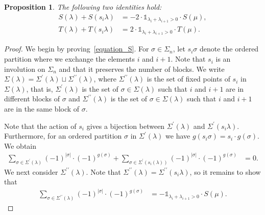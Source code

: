 \documentclass[10pt]{amsart}
\newtheorem{prop}[theorem]{Proposition}
\theoremstyle{definition}
\newcommand{\ungras}{\mathds{1}}
\begin{document}
\begin{prop}
The following two identities hold:
\begin{align}
S(\lambda) + S(s_{i}\lambda)
& =
-2 \cdot \ungras_{\lambda_{i}+\lambda_{i+1}>0}\cdot S(\mu) ,
\label{equation_S} \\
T(\lambda) + T(s_{i}\lambda)
& =
2 \cdot \ungras_{\lambda_{i}+\lambda_{i+1}>0}\cdot T(\mu) .
\label{equation_T}
\end{align}
\label{proposition_S_equal_T}
\end{prop}
\begin{proof}
We begin by proving~\eqref{equation_S}.
For $\sigma \in \Sigma_{n}$, let $s_{i}\sigma$ denote the
ordered partition where we exchange the elements $i$ and $i+1$.
Note that $s_{i}$ is an involution on $\Sigma_{n}$
and that it preserves the number of blocks.
We write
$\Sigma(\lambda) =\Sigma^{\prime}(\lambda) \sqcup \Sigma^{\prime\prime}(\lambda)$,
where $\Sigma^{\prime\prime}(\lambda)$ is the set of fixed points of $s_{i}$
in~$\Sigma(\lambda)$,
that is, 
$\Sigma^{\prime}(\lambda)$ is the set of $\sigma\in\Sigma(\lambda)$
such that $i$ and $i+1$ are in different blocks of $\sigma$
and
$\Sigma^{\prime\prime}(\lambda)$ is the set of $\sigma\in\Sigma(\lambda)$
such that $i$ and $i+1$ are in the same block of $\sigma$.



Note that the action of $s_{i}$ gives a bijection between
$\Sigma^{\prime}(\lambda)$ and $\Sigma^{\prime}(s_{i} \lambda)$.
Furthermore, for an ordered partition $\sigma$ in $\Sigma^{\prime}(\lambda)$
we have
$g(s_{i}\sigma) = s_{i}\cdot g(\sigma)$.
We obtain
\begin{align}
\sum_{\sigma \in \Sigma^{\prime}(\lambda)}
(-1)^{|\sigma|} \cdot (-1)^{g(\sigma)}
+
\sum_{\sigma \in \Sigma^{\prime}(s_{i}(\lambda))}
(-1)^{|\sigma|} \cdot (-1)^{g(\sigma)}
& = 0 
.
\label{equation_Sigma_prime}
\end{align}
We next consider $\Sigma^{\prime\prime}(\lambda)$.
Note that $\Sigma^{\prime\prime}(\lambda) =\Sigma^{\prime\prime}(s_{i}\lambda)$, so 
it remains to show that
\begin{align}
\sum_{\sigma\in\Sigma^{\prime\prime}(\lambda)}
(-1)^{|\sigma|} \cdot (-1)^{g(\sigma)}
& =
-\ungras_{\lambda_{i}+\lambda_{i+1}>0}\cdot S(\mu).
\label{equation_Sigma_prime_prime}
\end{align}



\end{proof}
\end{document}
